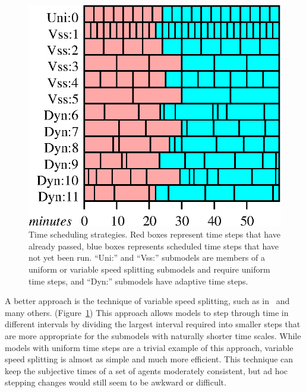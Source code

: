 \begin{figure}\label{times}
\begin{center}
  \includegraphics{Figure1}
  \caption{Time scheduling strategies.  Red boxes represent time steps that
    have already passed, blue boxes represents scheduled time steps
    that have not yet been run. ``Uni:''  and ``Vss:'' sub\-models are
    members of a uniform or variable speed splitting
    sub\-models and require uniform time steps, and ``Dyn:'' sub\-models
    have adaptive time steps.}
\end{center}
\end{figure}
A better approach is the technique of variable speed splitting, such
as in~\cite{walters2004fisheries} and many others. (Figure~\ref{times}) This approach allows models to step through time in
different intervals by dividing the largest interval required into
smaller steps that are more appropriate for the sub\-models with
naturally shorter time scales. While models with uniform time steps are
a trivial example of this approach, variable speed splitting is almost
as simple and much more efficient.  This technique can keep the
subjective times of a set of agents moderately consistent, but ad hoc
stepping changes would still seem to be awkward or difficult.

